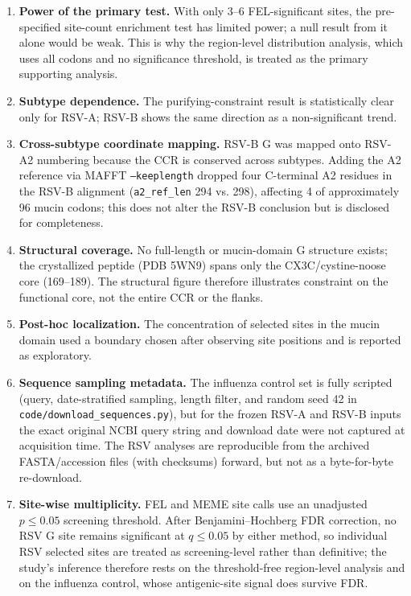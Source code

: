 \documentclass[11pt]{article}
\begin{document}
\begin{enumerate}
\item \textbf{Power of the primary test.} With only 3--6 FEL-significant sites, the pre-specified site-count enrichment test has limited power; a null result from it alone would be weak. This is why the region-level distribution analysis, which uses all codons and no significance threshold, is treated as the primary supporting analysis.
\item \textbf{Subtype dependence.} The purifying-constraint result is statistically clear only for RSV-A; RSV-B shows the same direction as a non-significant trend.
\item \textbf{Cross-subtype coordinate mapping.} RSV-B G was mapped onto RSV-A2 numbering because the CCR is conserved across subtypes. Adding the A2 reference via MAFFT \texttt{--keeplength} dropped four C-terminal A2 residues in the RSV-B alignment (\texttt{a2\_ref\_len} 294 vs. 298), affecting 4 of approximately 96 mucin codons; this does not alter the RSV-B conclusion but is disclosed for completeness.
\item \textbf{Structural coverage.} No full-length or mucin-domain G structure exists; the crystallized peptide (PDB 5WN9) spans only the CX3C/cystine-noose core (169--189). The structural figure therefore illustrates constraint on the functional core, not the entire CCR or the flanks.
\item \textbf{Post-hoc localization.} The concentration of selected sites in the mucin domain used a boundary chosen after observing site positions and is reported as exploratory.
\item \textbf{Sequence sampling metadata.} The influenza control set is fully scripted (query, date-stratified sampling, length filter, and random seed 42 in \texttt{code/download\_sequences.py}), but for the frozen RSV-A and RSV-B inputs the exact original NCBI query string and download date were not captured at acquisition time. The RSV analyses are reproducible from the archived FASTA/accession files (with checksums) forward, but not as a byte-for-byte re-download.
\item \textbf{Site-wise multiplicity.} FEL and MEME site calls use an unadjusted $p\leq0.05$ screening threshold. After Benjamini--Hochberg FDR correction, no RSV G site remains significant at $q\leq0.05$ by either method, so individual RSV selected sites are treated as screening-level rather than definitive; the study's inference therefore rests on the threshold-free region-level analysis and on the influenza control, whose antigenic-site signal does survive FDR.

\end{enumerate}
\end{document}
